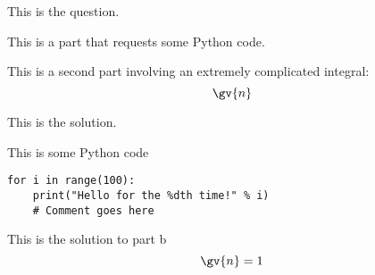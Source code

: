 
This is the question.
\begin{alpQ}
	\item This is a part that requests some Python code.
	\item This is a second part involving an extremely complicated integral: \[\gv{n}\]
\end{alpQ}

\midsep

\begin{solution}

	This is the solution.
	\begin{alpQ}
		\item This is some Python code
		\begin{lstlisting}[style=Python]
for i in range(100):
	print("Hello for the %dth time!" % i)
	# Comment goes here
		\end{lstlisting}
		\item This is the solution to part b
		\[\gv{n} = 1 \]
	\end{alpQ}

\end{solution}